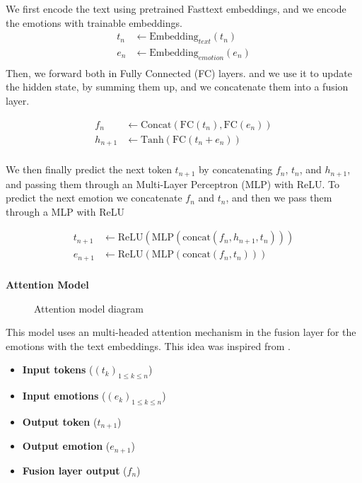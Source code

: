 \documentclass[oneside, a4paper, onecolumn, 11pt]{article}
\begin{document}
We first encode the text using pretrained Fasttext embeddings, and we encode the emotions with trainable embeddings.
\begin{align*}
  t_n &\leftarrow \text{Embedding}_{text}(t_n) \\
  e_n &\leftarrow \text{Embedding}_{emotion}(e_n) \\
\end{align*}
Then, we forward both in Fully Connected (FC) layers. and we use it to update the hidden state, by summing them up, and we concatenate them into a fusion layer.

\begin{align*}
  f_n &\leftarrow \text{Concat}(\text{FC}(t_n),\text{FC}(e_n)) \\
h_{n+1} &\leftarrow \text{Tanh}(\text{FC}(t_n + e_n))\\
\end{align*}

We then finally predict the next token $t_{n+1}$ by concatenating $f_n$, $t_n$, and $h_{n+1}$, and passing them through an Multi-Layer Perceptron (MLP) with ReLU.
To predict the next emotion we concatenate $f_n$ and $t_n$, and then we pass them through a MLP with ReLU

\begin{align*}
  t_{n+1} &\leftarrow \text{ReLU}(\text{MLP}(\text{concat}(f_n,h_{n+1},t_n))) \\
  e_{n+1} &\leftarrow \text{ReLU}(\text{MLP}(\text{concat}(f_n,t_n))) \\
\end{align*}

\begin{center}
  \textbf{Attention Model}

\begin{figure}[ht]

\caption{Attention model diagram}
\end{figure}

\end{center}
This model uses an multi-headed attention mechanism in the fusion layer for the emotions with the text embeddings. This idea was inspired from \cite{LIU2025126924}.

\begin{itemize}
  \item \textbf{Input tokens} ($(t_k)_{1 \leq k \leq n}$)
  \item \textbf{Input emotions }($(e_k)_{1 \leq k \leq n}$)
  \item \textbf{Output token }($t_{n+1}$)
  \item \textbf{Output emotion }($e_{n+1}$)
  \item \textbf{Fusion layer output }($f_n$)
\end{itemize}
\end{document}
